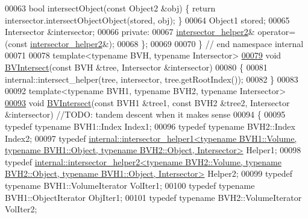 \begin{DoxyCode}
00063   \textcolor{keywordtype}{bool} intersectObject(\textcolor{keyword}{const} Object2 &obj) \{ \textcolor{keywordflow}{return} intersector.intersectObjectObject(stored, obj); \}
00064   Object1 stored;
00065   Intersector &intersector;
00066 \textcolor{keyword}{private}:
00067   \hyperlink{struct_eigen_1_1internal_1_1intersector__helper2}{intersector\_helper2}& operator=(\textcolor{keyword}{const} \hyperlink{struct_eigen_1_1internal_1_1intersector__helper2}{intersector\_helper2}&);
00068 \};
00069 
00070 \} \textcolor{comment}{// end namespace internal}
00071 
00078 \textcolor{keyword}{template}<\textcolor{keyword}{typename} BVH, \textcolor{keyword}{typename} Intersector>
\hyperlink{namespace_eigen_a07d8e283f082c972338f3fc4f644b2a9}{00079} \textcolor{keywordtype}{void} \hyperlink{namespace_eigen_a07d8e283f082c972338f3fc4f644b2a9}{BVIntersect}(\textcolor{keyword}{const} BVH &tree, Intersector &intersector)
00080 \{
00081   internal::intersect\_helper(tree, intersector, tree.getRootIndex());
00082 \}
00083 
00092 \textcolor{keyword}{template}<\textcolor{keyword}{typename} BVH1, \textcolor{keyword}{typename} BVH2, \textcolor{keyword}{typename} Intersector>
\hyperlink{namespace_eigen_ac3b8047a3ee05b5e6fec4668197a9a43}{00093} \textcolor{keywordtype}{void} \hyperlink{namespace_eigen_a07d8e283f082c972338f3fc4f644b2a9}{BVIntersect}(\textcolor{keyword}{const} BVH1 &tree1, \textcolor{keyword}{const} BVH2 &tree2, Intersector &intersector) \textcolor{comment}{//TODO: tandem
       descent when it makes sense}
00094 \{
00095   \textcolor{keyword}{typedef} \textcolor{keyword}{typename} BVH1::Index Index1;
00096   \textcolor{keyword}{typedef} \textcolor{keyword}{typename} BVH2::Index Index2;
00097   \textcolor{keyword}{typedef} 
      \hyperlink{struct_eigen_1_1internal_1_1intersector__helper1}{internal::intersector\_helper1<typename BVH1::Volume, typename BVH1::Object, typename BVH2::Object,
       Intersector>}
       Helper1;
00098   \textcolor{keyword}{typedef} 
      \hyperlink{struct_eigen_1_1internal_1_1intersector__helper2}{internal::intersector\_helper2<typename BVH2::Volume, typename BVH2::Object, typename BVH1::Object,
       Intersector>}
       Helper2;
00099   \textcolor{keyword}{typedef} \textcolor{keyword}{typename} BVH1::VolumeIterator VolIter1;
00100   \textcolor{keyword}{typedef} \textcolor{keyword}{typename} BVH1::ObjectIterator ObjIter1;
00101   \textcolor{keyword}{typedef} \textcolor{keyword}{typename} BVH2::VolumeIterator VolIter2;

\end{DoxyCode}
